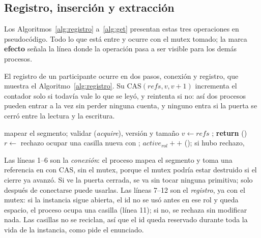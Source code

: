 \subsection{Registro, inserción y extracción}

Los Algoritmos~\ref{alg:registro} a~\ref{alg:get} presentan estas tres
operaciones en pseudocódigo. Todo lo que está entre
 y  ocurre con el mutex tomado; la marca
\textbf{efecto} señala la línea donde la operación pasa a ser visible para
los demás procesos.

El registro de un participante ocurre en dos pasos, conexión y registro,
que muestra el Algoritmo~\ref{alg:registro}. Su
$\mathrm{CAS}(\mathit{refs}, v, v+1)$ incrementa el contador solo si
 todavía vale lo que se leyó, y reintenta si no: así dos procesos
pueden entrar a la vez sin perder ninguna cuenta, y ninguno entra si la
puerta se cerró entre la lectura y la escritura.

\begin{algorithm}[H]
\caption{Conexión y registro}
\label{alg:registro}
\footnotesize
\begin{algorithmic}[1]
\STATE mapear el segmento; validar  (\emph{acquire}), versión y tamaño
\REPEAT
  \STATE $v \gets \mathit{refs}$
    \STATE {}; \textbf{return}  
  \ENDIF
{} 
\STATE {}()
  \STATE $r \gets$ rechazo 
\ELSE
  \STATE ocupar una casilla nueva con ; $\mathit{active}_{\mathit{rol}}{+}{+}$ 
\ENDIF
\STATE {}(); si hubo rechazo, 
\end{algorithmic}
\end{algorithm}

Las líneas 1--6 son la \emph{conexión}: el proceso mapea el segmento y toma
una referencia en  con CAS, sin el mutex, porque el mutex podría
estar destruido si el cierre ya avanzó. Si ve la puerta cerrada, se va sin
tocar ninguna primitiva; solo después de conectarse puede usarlas. Las
líneas 7--12 son el \emph{registro}, ya con el mutex: si la instancia
sigue abierta, el id no se usó antes en ese rol y queda espacio, el
proceso ocupa una casilla (línea 11); si no, se rechaza sin modificar
nada. Las casillas no se reciclan, así que el id queda reservado durante
toda la vida de la instancia, como pide el enunciado.

